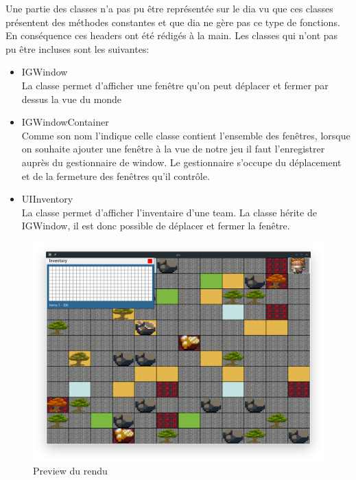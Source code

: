 \documentclass[a4paper,12pt]{article}
\begin{document}
Une partie des classes n'a pas pu être représentée sur le dia vu que ces classes présentent des méthodes constantes et que dia ne gère pas ce type de fonctions. En conséquence ces headers ont été rédigés à la main. Les classes qui n'ont pas pu être incluses sont les suivantes:
\begin{itemize}
    \item IGWindow\\
    La classe permet d'afficher une fenêtre qu'on peut déplacer et fermer par dessus la vue du monde
    \item IGWindowContainer\\
    Comme son nom l'indique celle classe contient l'ensemble des fenêtres, lorsque on souhaite ajouter une fenêtre à la vue de notre jeu il faut l'enregistrer auprès du gestionnaire de window. Le gestionnaire s'occupe du déplacement et de la fermeture des fenêtres qu'il contrôle.
    \item UIInventory\\
    La classe permet d'afficher l'inventaire d'une team. La classe hérite de IGWindow, il est donc possible de déplacer et fermer la fenêtre.
\end{itemize}

\begin{figure}[ht]
    \centering
    \includegraphics[width=\textwidth]{render_preview.png}
    \caption{Preview du rendu}
\end{figure}
\end{document}
